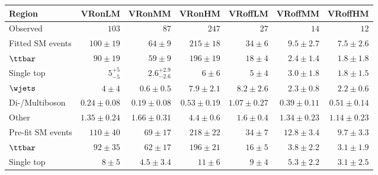 

\begin{table}
\begin{center}
{\small
\begin{tabular}{lrrrrrr}
\toprule
Region     & VRonLM            & VRonMM            & VRonHM    & VRoffLM            & VRoffMM            & VRoffHM              \\[-0.05cm]
\midrule
Observed      & $103$              & $87$              & $247$      & $27$              & $14$              & $12$                    \\
\midrule
Fitted SM events    & $100 \pm 19$          & $64 \pm 9$          & $215 \pm 18$        & $34 \pm 6$          & $9.5 \pm 2.7$          & $7.5 \pm 2.6$              \\
\midrule
        $\ttbar$   & $90 \pm 19$          & $59 \pm 9$          & $196 \pm 19$      & $18 \pm 4$          & $2.4 \pm 1.4$          & $1.8 \pm 1.8$              \\
        Single top       & $5_{-5}^{+5}$          & $2.6_{-2.6}^{+2.9}$          & $6 \pm 6$         & $5 \pm 4$          & $3.0 \pm 1.8$          & $1.8 \pm 1.5$              \\
        $\wjets$       & $4 \pm 4$          & $0.6 \pm 0.5$          & $7.9 \pm 2.1$    & $8.2 \pm 2.6$          & $2.3 \pm 0.8$          & $2.2 \pm 0.6$              \\
        Di-/Multiboson       & $0.24 \pm 0.08$          & $0.19 \pm 0.08$          & $0.53 \pm 0.19$     & $1.07 \pm 0.27$          & $0.39 \pm 0.11$          & $0.51 \pm 0.14$              \\
        Other     & $1.35 \pm 0.24$          & $1.66 \pm 0.31$          & $4.4 \pm 0.6$      & $1.6 \pm 0.4$          & $1.34 \pm 0.23$          & $1.14 \pm 0.23$              \\
\toprule
Pre-fit SM events          & $110 \pm 40$          & $69 \pm 17$          & $218 \pm 22$         & $34 \pm 7$          & $12.8 \pm 3.4$          & $9.7 \pm 3.3$              \\
\midrule
        $\ttbar$      & $92 \pm 35$          & $62 \pm 17$          & $196 \pm 21$     & $16 \pm 5$          & $3.8 \pm 2.2$          & $3.1 \pm 1.9$              \\
        Single top          & $8 \pm 5$          & $4.5 \pm 3.4$          & $11 \pm 6$     & $9 \pm 4$          & $5.3 \pm 2.2$          & $3.1 \pm 2.5$              \\

\end{tabular}}
\end{center}
\end{table}
